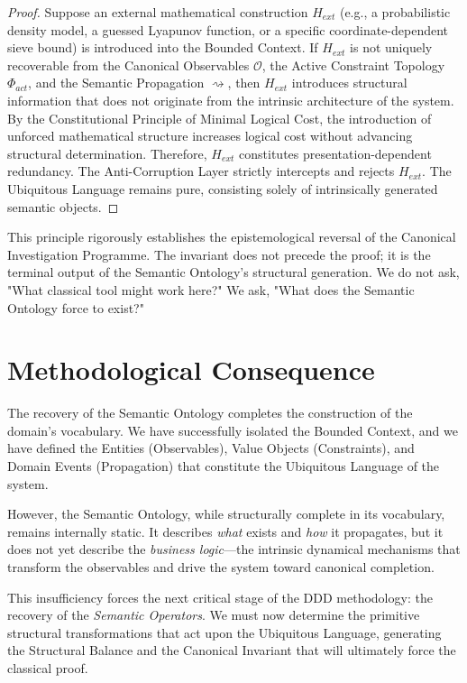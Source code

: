 \documentclass[12pt,openany]{extbook}
\theoremstyle{plain}
\theoremstyle{definition}
\begin{document}
\begin{proof}
Suppose an external mathematical construction $H_{ext}$ (e.g., a probabilistic density model, a guessed Lyapunov function, or a specific coordinate-dependent sieve bound) is introduced into the Bounded Context. 
If $H_{ext}$ is not uniquely recoverable from the Canonical Observables $\mathcal{O}$, the Active Constraint Topology $\Phi_{act}$, and the Semantic Propagation $\rightsquigarrow$, then $H_{ext}$ introduces structural information that does not originate from the intrinsic architecture of the system.
By the Constitutional Principle of Minimal Logical Cost, the introduction of unforced mathematical structure increases logical cost without advancing structural determination. Therefore, $H_{ext}$ constitutes presentation-dependent redundancy.
The Anti-Corruption Layer strictly intercepts and rejects $H_{ext}$. The Ubiquitous Language remains pure, consisting solely of intrinsically generated semantic objects.
\end{proof}

This principle rigorously establishes the epistemological reversal of the Canonical Investigation Programme. The invariant does not precede the proof; it is the terminal output of the Semantic Ontology's structural generation. We do not ask, "What classical tool might work here?" We ask, "What does the Semantic Ontology force to exist?"

\section{Methodological Consequence}

The recovery of the Semantic Ontology completes the construction of the domain's vocabulary. We have successfully isolated the Bounded Context, and we have defined the Entities (Observables), Value Objects (Constraints), and Domain Events (Propagation) that constitute the Ubiquitous Language of the system.

However, the Semantic Ontology, while structurally complete in its vocabulary, remains internally static. It describes \emph{what} exists and \emph{how} it propagates, but it does not yet describe the \emph{business logic}---the intrinsic dynamical mechanisms that transform the observables and drive the system toward canonical completion.

This insufficiency forces the next critical stage of the DDD methodology: the recovery of the \emph{Semantic Operators}. We must now determine the primitive structural transformations that act upon the Ubiquitous Language, generating the Structural Balance and the Canonical Invariant that will ultimately force the classical proof.
\end{document}
